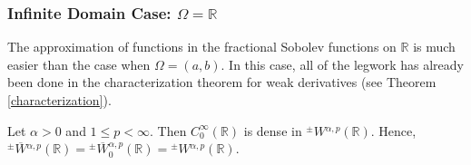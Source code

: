 \documentclass[leqno,final]{siamltex}
\numberwithin{equation}{section}
\newcommand{\eps}{\varepsilon}
\renewcommand{\(}{\bigl(}
\renewcommand{\)}{\bigr)}
\newcommand{\R}{\mathbb{R}}
\newcommand{\N}{\mathbb{N}}
\begin{document}
    \subsubsection{\bf Infinite Domain Case: $\Omega=\R$}\label{sec-4.1.2}
    The approximation of functions in the fractional Sobolev functions on $\R$ is much easier than the case when $\Omega=(a,b)$. In this case, all of the legwork has already been done in the characterization theorem for weak derivatives  (see Theorem \ref{characterization}).
    
%


    \begin{theorem}
        Let $\alpha >0$ and $1 \leq p <\infty$. Then $C^{\infty}_{0}(\R)$ is dense in ${^{\pm}}{W}{^{\alpha,p}}(\R)$. Hence, ${^{\pm}}{\overline{W}}{^{\alpha,p}}(\R) =
        {^{\pm}}{\overline{W}}{^{\alpha,p}_{0}}(\R)= {^{\pm}}{W}{^{\alpha,p}}(\R)$.
    \end{theorem}
    
\end{document}
